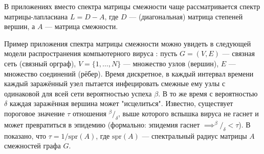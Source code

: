 В приложениях вместо спектра матрицы смежности чаще рассматривается
спектр матрицы-лапласиана \( L = D - A \),
где \( D \) --- (диагональная) матрица степеней вершин,
а \( A \) --- матрица смежности.

Пример приложения спектра матрицы смежности можно увидеть
в следующей модели распространения компьютерного вируса \cite{epidemic-eigenvalues}:
пусть \( G = (V, E) \) --- связная сеть (связный орграф),
\( V = \{1, \ldots, N\} \) --- множество узлов (вершин),
\( E \) --- множество соединений (рёбер).
Время дискретное, в каждый интервал времени каждый заражённый узел
пытается инфецировать смежные ему узлы с одинаковой для всей сети вероятностью успеха \( \beta \).
В то же время с вероятностью \( \delta \) каждая заражённая вершина может "исцелиться".
Известно, существует пороговое значение \( \tau \) отношения \( {^\beta}/_{\delta} \),
выше которого вспышка вируса не гаснет и может превратиться в эпидемию
(формально: эпидемия гаснет \( \implies ^{\beta}/_{\delta} < \tau \)).
В \cite{epidemic-eigenvalues} показано, что \( \tau = 1/\mathrm{spr}\left({A}\right) \),
где \( \mathrm{spr}\left({A}\right) \) --- спектральный радиус матрицы \( A \) смежностей графа \( G \).
